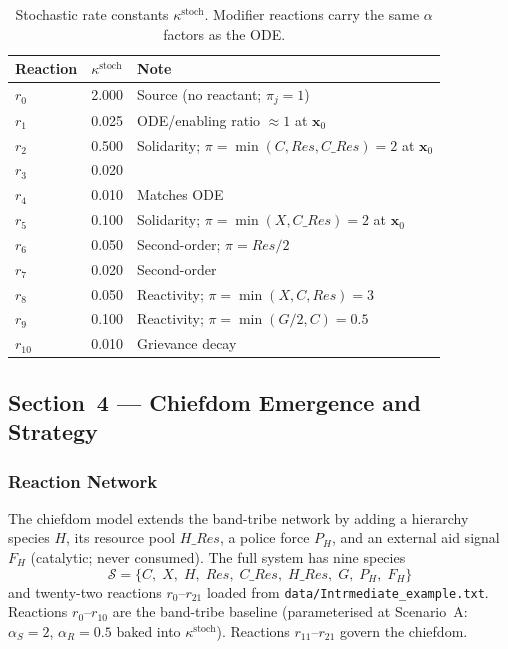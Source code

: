 \begin{table}[h]
\centering
\caption{Stochastic rate constants $\kappa^{\text{stoch}}$.  Modifier
         reactions carry the same $\alpha$ factors as the ODE.}
\label{tab:s3_stoch_params}
\begin{tabular}{lll}
\toprule
Reaction  & $\kappa^{\text{stoch}}$ & Note \\
\midrule
$r_0$     & 2.000   & Source (no reactant; $\pi_j=1$) \\
$r_1$     & 0.025   & ODE/enabling ratio $\approx 1$ at $\mathbf{x}_0$ \\
$r_2$     & 0.500   & Solidarity; $\pi=\min(C,\textit{Res},C\_\textit{Res})=2$ at $\mathbf{x}_0$ \\
$r_3$     & 0.020   & \\
$r_4$     & 0.010   & Matches ODE \\
$r_5$     & 0.100   & Solidarity; $\pi=\min(X,C\_\textit{Res})=2$ at $\mathbf{x}_0$ \\
$r_6$     & 0.050   & Second-order; $\pi=\textit{Res}/2$ \\
$r_7$     & 0.020   & Second-order \\
$r_8$     & 0.050   & Reactivity; $\pi=\min(X,C,\textit{Res})=3$ \\
$r_9$     & 0.100   & Reactivity; $\pi=\min(G/2,C)=0.5$ \\
$r_{10}$  & 0.010   & Grievance decay \\
\bottomrule
\end{tabular}
\end{table}

\subsection{Section~4 — Chiefdom Emergence and Strategy}
\label{app:sec4}

\subsubsection*{Reaction Network}

The chiefdom model extends the band-tribe network by adding a hierarchy
species $H$, its resource pool $H\_\textit{Res}$, a police force $P_H$,
and an external aid signal $F_H$ (catalytic; never consumed).  The full
system has nine species
\begin{equation*}
    \mathcal{S} = \{C,\;X,\;H,\;\textit{Res},\;C\_\textit{Res},\;
                    H\_\textit{Res},\;G,\;P_H,\;F_H\}
\end{equation*}
and twenty-two reactions $r_0$--$r_{21}$ loaded from
\texttt{data/Intrmediate\_example.txt}.
Reactions $r_0$--$r_{10}$ are the band-tribe baseline (parameterised at
Scenario~A: $\alpha_S=2$, $\alpha_R=0.5$ baked into $\kappa^{\text{stoch}}$).
Reactions $r_{11}$--$r_{21}$ govern the chiefdom.

